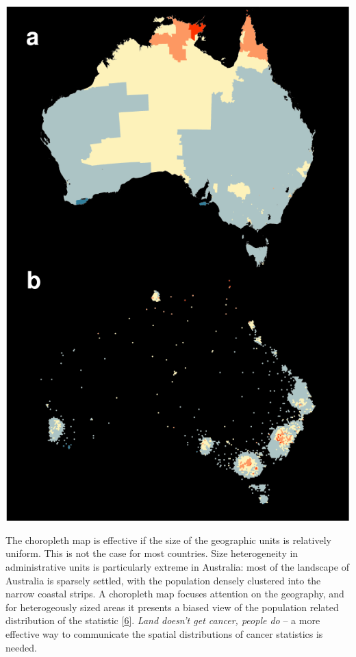 \documentclass[conference,final,]{IEEEtran}
\makeatletter
\def\maxwidth{\ifdim\Gin@nat@width>\linewidth\linewidth
\else\Gin@nat@width\fi}
\let\Oldincludegraphics\includegraphics
\renewcommand{\includegraphics}[1]{\Oldincludegraphics[width=\maxwidth]{#1}}
\makeatother
\begin{document}
\includegraphics{paper_files/figure-latex/liver-1.pdf}

The choropleth map is effective if the size of the geographic units is relatively uniform. This is not the case for most countries. Size heterogeneity in administrative units is particularly extreme in Australia: most of the landscape of Australia is sparsely settled, with the population densely clustered into the narrow coastal strips. A choropleth map focuses attention on the geography, and for heterogeously sized areas it presents a biased view of the population related distribution of the statistic {[}\protect\hyperlink{ref-CBATCC}{6}{]}. \emph{Land doesn't get cancer, people do} -- a more effective way to communicate the spatial distributions of cancer statistics is needed.
\end{document}
